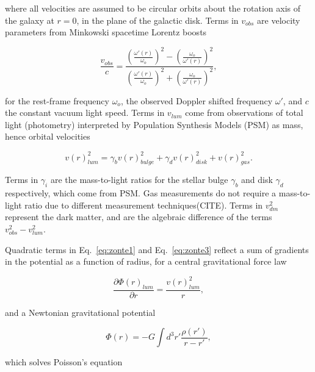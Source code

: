 \documentclass[reprint,%
 amsmath,amssymb,
 aps,
]{revtex4-1}
\begin{document}
  where all velocities are assumed to be circular orbits about the rotation axis of the galaxy at  $r=0$, in the plane of the galactic disk. 
Terms in  $v_{obs}$ are velocity parameters   from Minkowski spacetime Lorentz boosts 
   

 \begin{equation}
 \frac{v_{obs} }{c}=
\frac{  \left( \frac{\omega'(r)}{\omega_o}\right)^2 -  \left( \frac{\omega_o}{\omega'(r)} \right)^2 }{  \left( \frac{\omega'(r)}{\omega_o}\right)^2  +  \left( \frac{\omega_o}{\omega'(r)}\right)^2 },
\label{eq:modelLumA}
\end{equation} 

 for    
 the rest-frame frequency $\omega_o$, the  observed  Doppler shifted frequency $\omega'$, and $c$  the constant vacuum light speed.  
 Terms in  $v_{lum}$ come from observations of total light  (photometry) interpreted by Population Synthesis Models (PSM) as mass,   hence orbital velocities  
  
   \begin{equation}
v(r)_{lum}^2 = \gamma_b v(r)_{bulge}^2 +  \gamma_d v(r)_{disk}^2 + v(r)_{gas}^2.    
\label{eq:zonte3}
\end{equation} 
  
 Terms in    $\gamma_i$  are the mass-to-light ratios for the stellar bulge $\gamma_b$ and disk $\gamma_d$ respectively, which come from PSM. Gas measurements do not require  a mass-to-light ratio due to different measurement techniques(CITE).  
 Terms in $v^2_{dm}$ represent
the dark matter, and  are  the algebraic difference of the   terms  $v^2_{obs}-v^2_{lum}$. 

  Quadratic terms in  Eq.~\ref{eq:zonte1} and Eq.~\ref{eq:zonte3}  reflect a   sum of gradients in the potential as a function of  radius, 
 for a central gravitational    force law   

\begin{equation}
 \frac{\partial \Phi(r)_{lum}}{\partial r}    =\frac{v(r)_{lum}^2}{r},  
    \label{zoochance1}
\end{equation}

  
   
and a  Newtonian gravitational potential 

\begin{equation}
      \Phi(r)  = -G \int d^3r'  \frac{ \rho(r') }{r-r'} ,
      \label{eq:Newt}
      \end{equation}

which solves Poisson's equation
\end{document}
